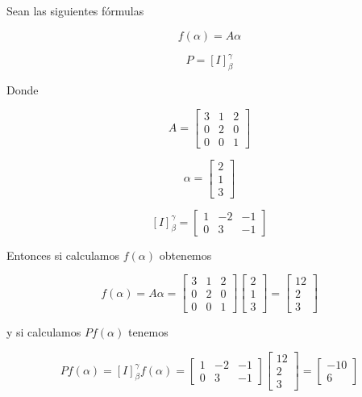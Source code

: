 \documentclass{report}
\begin{document}
    \begin{Example}
        Sean las siguientes fórmulas
        
        $$f(\alpha) = A\alpha$$
        
        $$P = [I]_\beta^\gamma$$
        
        Donde
        
        $$A = \begin{bmatrix}
            3 & 1 & 2\\
            0 & 2 & 0\\
            0 & 0 & 1
        \end{bmatrix}$$
        
        $$\alpha = \begin{bmatrix}
            2\\1\\3
        \end{bmatrix}$$
        
        $$[I]_\beta^\gamma = \begin{bmatrix}
            1 & -2 & -1\\
            0 & 3 & -1
        \end{bmatrix}$$
        
        Entonces si calculamos $f(\alpha)$ obtenemos
        
        $$f(\alpha) = A\alpha = \begin{bmatrix}
            3 & 1 & 2\\
            0 & 2 & 0\\
            0 & 0 & 1
        \end{bmatrix}\begin{bmatrix}
            2\\1\\3
        \end{bmatrix} = \begin{bmatrix}
            12\\2\\3
        \end{bmatrix}$$
        
        y si calculamos $Pf(\alpha)$ tenemos
        
        $$Pf(\alpha) = [I]_\beta^\gamma f(\alpha) = \begin{bmatrix}
            1 & -2 & -1\\
            0 & 3 & -1
        \end{bmatrix}\begin{bmatrix}
            12\\2\\3
        \end{bmatrix} = \begin{bmatrix}
            -10\\ 6
        \end{bmatrix}$$
    \end{Example}
    
\end{document}
